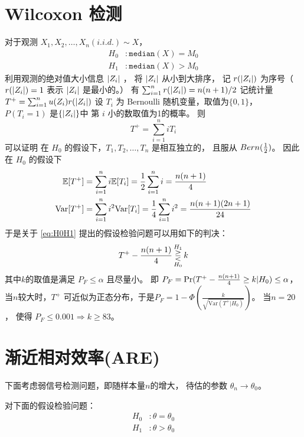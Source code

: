 \documentclass{ctexart}
\numberwithin{equation}{section}
\def\E{\mathbb{E}}
\def\Var{\textrm{Var}}
\DeclarePairedDelimiter\abs{\lvert}{\rvert}
\begin{document}
\section{Wilcoxon 检测}
对于观测 $X_1, X_2, \dots, X_n (i.i.d.)\sim X$，
\begin{align}
H_0 & : \mathtt{median}(X)  = M_0 \nonumber \\
\label{eq:H0H1} H_1 & : \mathtt{median}(X) > M_0
\end{align}
利用观测的绝对值大小信息 $\abs{Z_i}$ ， 
将 $\abs{Z_i} $ 从小到大排序，
记 $ r(\abs{Z_i}) $ 为序号（$ r(\abs{Z_i})  = 1 $ 表示 $\abs{Z_i} $ 是最小的。）
有 $ \sum_{ i = 1}^n r(\abs{Z_i}) = n(n+1)/2 $
记统计量 $ T^+ = \sum_{ i = 1}^n u(Z_i) r(\abs{Z_i}) $
设 $T_i $ 为 Bernoulli 随机变量，取值为$\{0, 1\}$， $P( T_i = 1 )$ 是$\{ \abs{Z_i} \} $中 第 $i$ 小的数取值为1的概率。
则
\begin{equation}
 T^+ = \sum_{ i = 1 }^n i T_i
\end{equation}
可以证明 在 $H_0 $ 的假设下，$T_1, T_2, \dots, T_n$ 是相互独立的， 且服从 $Bern({1\over 2})$。
因此在 $H_0 $ 的假设下
\begin{align}
\E[T^+] & = \sum_{i=1}^n i \E[T_i] = {1 \over 2}\sum_{i=1}^n i   = { n(n+1) \over 4 } \\
\label{eq:VarT}\Var[T^+] & = \sum_{i=1}^n i^2 \Var[T_i] = {1 \over 4}\sum_{i=1}^n i^2   = { n(n+1)(2n+1) \over 24}  
\end{align}
于是关于 \eqref{eq:H0H1} 提出的假设检验问题可以用如下的判决：
$$
T^+ - { n(n+1) \over 4} \mathop{\gtreqless}^{H_1}_{H_0} k
$$
其中$k$的取值是满足 $P_F \leq \alpha $ 且尽量小。
即 $P_F = \Pr( T^+ - { n(n+1) \over 4} \geq k | H_0 ) \leq \alpha $，
当$n$较大时，$T^+$ 可近似为正态分布，于是$P_F = 1 - \Phi(\frac{k}{\sqrt{\Var(T^+ | H_0)}})$。
当$ n = 20$， 使得 $ P_F \leq 0.001 \Rightarrow k \geq 83$。

\section{渐近相对效率(ARE)}


下面考虑弱信号检测问题，即随样本量$n$的增大， 待估的参数 $ \theta_n \to \theta_0$。

对下面的假设检验问题：
\begin{align}
H_0 & : \theta = \theta_0 \nonumber \\
H_1 & : \theta  > \theta_0
\end{align}
\end{document}
